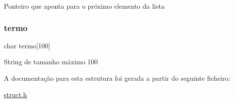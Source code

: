 Ponteiro que aponta para o próximo elemento da lista \mbox{\label{structlse_a9df8ca8433f565cd387dd62ce6023a51}} 
\subsubsection{\texorpdfstring{termo}{termo}}
{\footnotesize\ttfamily char termo\mbox{[}100\mbox{]}}

String de tamanho máximo 100 

A documentação para esta estrutura foi gerada a partir do seguinte ficheiro\+:\begin{DoxyCompactItemize}
\item 
\hyperlink{struct_8h}{struct.\+h}\end{DoxyCompactItemize}
